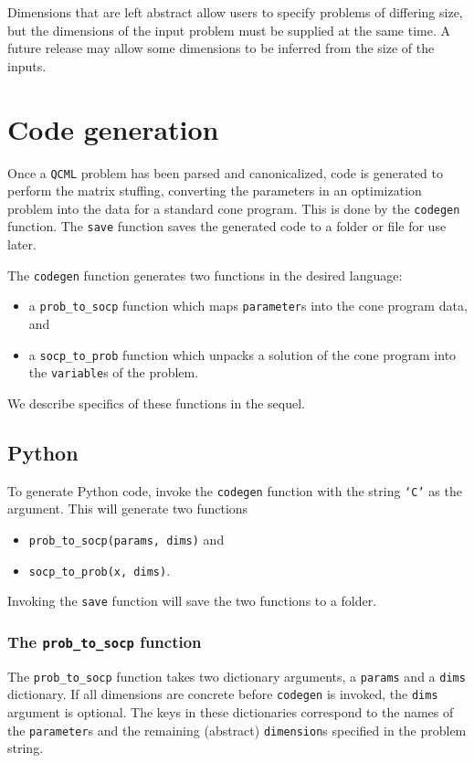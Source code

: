 \documentclass[11pt]{article}
\def\qcml{\texttt{QCML}\xspace}
\begin{document}
Dimensions that are left abstract allow users to specify problems of
differing size, but the dimensions of the input problem must be supplied at
the same time. A future release may allow some dimensions to be inferred from
the size of the inputs.

\section{Code generation}
\label{s-ug-codegen}
Once a \qcml problem has been parsed and canonicalized, code is generated
to perform the matrix stuffing, converting the parameters in an optimization
problem into the data for a standard cone program. This is done by the
{\tt codegen} function. The {\tt save} function saves the generated code to
a folder or file for use later.

The {\tt codegen} function generates two functions in the desired language:
\begin{itemize}
\item a {\tt prob\_to\_socp} function which maps {\tt parameter}s into the cone
program data, and
\item a {\tt socp\_to\_prob} function which unpacks a solution of the cone program
into the {\tt variable}s of the problem.
\end{itemize}
We describe specifics of these functions in the sequel.

\subsection{Python}
To generate Python code, invoke the {\tt codegen} function with the string
{\tt `C'} as the argument. This will generate two functions
\begin{itemize}
\item {\tt prob\_to\_socp(params, dims)} and
\item {\tt socp\_to\_prob(x, dims)}.
\end{itemize}
Invoking the {\tt save} function will save the two functions to a folder.

\subsubsection{The {\tt prob\_to\_socp} function}
The {\tt prob\_to\_socp} function takes two dictionary
arguments, a {\tt params} and a {\tt dims} dictionary. If all dimensions are
concrete before {\tt codegen} is invoked, the {\tt dims} argument is optional.
The keys in these
dictionaries correspond to the names of the {\tt parameter}s and the 
remaining (abstract)
{\tt dimension}s specified in the problem string.
\end{document}

